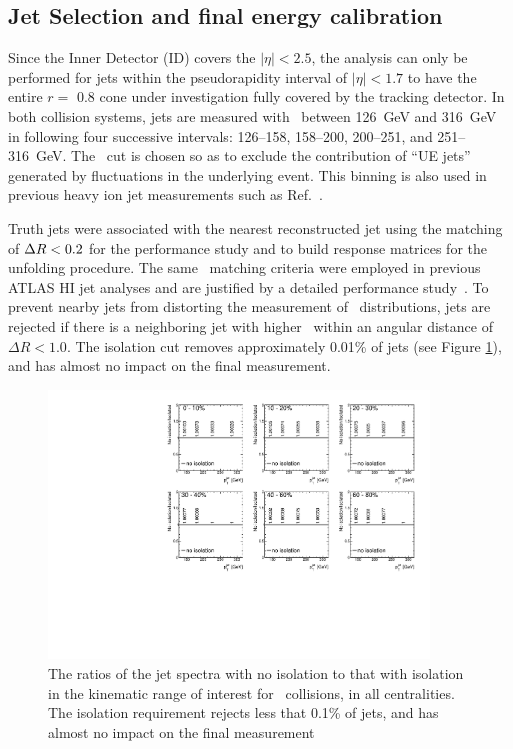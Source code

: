 \subsection{Jet Selection and final energy calibration}
\label{Sec:JetSelection}
Since the Inner Detector (ID) covers the $|\eta| < 2.5$, the analysis can only be performed for jets within the pseudorapidity interval of $|\eta| < 1.7$ to have the entire $ r = $ 0.8 cone under investigation fully covered by the tracking detector.
In both collision systems, jets are measured with \ptjet\ between 126~GeV and 316~GeV in following four successive intervals: 126--158, 158--200, 200--251, and 251--316~GeV.
The \ptjet\ cut is chosen so as to exclude the contribution of ``UE jets'' generated by fluctuations in the underlying event.
This binning is also used in previous heavy ion jet measurements such as Ref.~\cite{PhysRevC.98.024908}.

Truth jets were associated with the nearest reconstructed jet using the matching of $\mbox{$\Delta R$}<0.2$ for the performance study and to build response matrices for the unfolding procedure.
The same \dR\ matching criteria were employed in previous ATLAS HI jet analyses and are justified by a detailed performance study~\cite{ATLAS-COM-PHYS-2011-1733}.
To prevent nearby jets from distorting the measurement of \Dptr\ distributions, jets are rejected if there is a neighboring jet with higher \ptjet\ within an angular distance of $\Delta R < 1.0$.
The isolation cut removes approximately 0.01\% of jets (see Figure \ref{fig:ISO}), and has almost no impact on the final measurement.

\begin{figure}
\centering
\includegraphics[width=0.9\textwidth]{figures/main/performance/jet_iso.pdf}
\caption{The ratios of the jet spectra with no isolation to that with isolation in the kinematic range of interest for \pbpb\ collisions, in all centralities.
The isolation requirement rejects less that 0.1\% of jets, and has almost no impact on the final measurement}
\label{fig:ISO}
\end{figure}  

